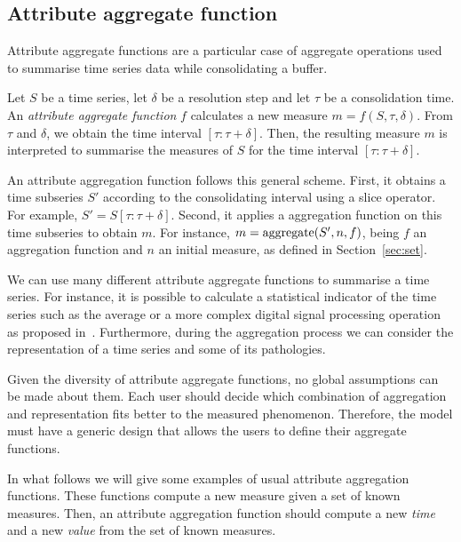 \subsection{Attribute aggregate function}
\label{sec:model:interpolador}

Attribute aggregate functions are a particular case of 
aggregate operations used to summarise time series data while
consolidating a buffer.

Let $S$ be a time series, let $\delta$ be a resolution step and let
$\tau$ be a consolidation time.  An \emph{attribute aggregate
  function} $f$ calculates a new measure $m=f(S,\tau,\delta)$. From
$\tau$ and $\delta$, we obtain the time interval $[\tau:\tau+\delta]$.
Then, the resulting measure $m$ is interpreted to summarise the
measures of $S$ for the time interval $[\tau:\tau+\delta]$.

An attribute aggregation function follows this general scheme. First,
it obtains a time subseries $S'$ according to the consolidating
interval using a slice operator. For example, $S' =
S[\tau:\tau+\delta]$. Second, it applies a  aggregation
function on this time subseries to obtain $m$. For instance, $m =
\operatorname*{aggregate}(S',n, f)$, being $f$ an aggregation function and $n$ an initial
measure, as defined in Section~\ref{sec:set}.

We can use many different attribute aggregate functions to summarise a
time series. For instance, it is possible to calculate a statistical
indicator of the time series such as the average or a more complex
digital signal processing operation as proposed
in~\cite{zhang11}. Furthermore, during the aggregation process we can
consider the representation of a time series and some of its
pathologies.

Given the diversity of attribute aggregate functions, no global
assumptions can be made about them. Each user should decide which
combination of aggregation and representation fits better to the
measured phenomenon.  Therefore, the  model must have a
generic design that allows the users to define their aggregate
functions.

In what follows we will give some examples of usual attribute
aggregation functions. These functions compute a new measure given a
set of known measures. Then, an attribute aggregation function should
compute a new \emph{time} and a new \emph{value} from the set of known
measures.

